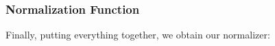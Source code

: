 \subsubsection*{Normalization Function}

Finally, putting everything together, we obtain our normalizer:

\begin{code}%
\>[0]\AgdaSpace{}%
\AgdaSymbol{:}\AgdaSpace{}%
\AgdaSpace{}%
\AgdaSpace{}%
\AgdaSpace{}%
\AgdaSpace{}%
\AgdaSpace{}%
\AgdaSpace{}%
\<%
\\
\>[0]\AgdaSpace{}%
\AgdaSymbol{(}\AgdaSpace{}%
\AgdaSymbol{)}\AgdaSpace{}%
\AgdaSymbol{=}\AgdaSpace{}%
\AgdaSpace{}%
\<%
\\
\>[0]\AgdaSpace{}%
\AgdaSymbol{(}\AgdaSpace{}%
\AgdaSymbol{)}\AgdaSpace{}%
\AgdaSymbol{=}\AgdaSpace{}%
\AgdaSpace{}%
\AgdaSymbol{(}\AgdaSpace{}%
\AgdaSymbol{)}\<%
\\
\>[0]\AgdaSpace{}%
\AgdaSymbol{(}\AgdaSpace{}%
\AgdaOperator{\AgdaInductiveConstructor{\$}}\AgdaSpace{}%
\AgdaSymbol{)}\AgdaSpace{}%
\AgdaSymbol{=}\AgdaSpace{}%
\AgdaSpace{}%
\AgdaSymbol{(}\AgdaSpace{}%
\AgdaSymbol{)}\AgdaSpace{}%
\AgdaSymbol{(}\AgdaSpace{}%
\AgdaSymbol{)}\<%
\\
\>[0]\AgdaSpace{}%
\AgdaSymbol{(}\AgdaSpace{}%
\AgdaSpace{}%
\AgdaSymbol{)}\AgdaSpace{}%
\AgdaSymbol{=}\AgdaSpace{}%
\AgdaSpace{}%
\AgdaSpace{}%
\AgdaSymbol{(}\AgdaSpace{}%
\AgdaSpace{}%
\AgdaSymbol{)}\<%
\\
\>[0]\AgdaSpace{}%
\AgdaSymbol{(}\AgdaSpace{}%
\AgdaSpace{}%
\AgdaSymbol{)}\AgdaSpace{}%
\AgdaSymbol{=}\AgdaSpace{}%
\AgdaSpace{}%
\AgdaSpace{}%
\AgdaSymbol{(}\AgdaSpace{}%
\AgdaSpace{}%
\AgdaSymbol{)}\<%
\end{code}

